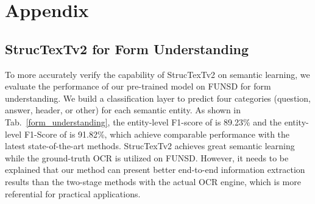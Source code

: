 \documentclass{article} \usepackage{iclr2023_conference,times}
\begin{document}





\appendix
\clearpage
\section{Appendix}
\subsection{StrucTexTv2 for Form Understanding}
To more accurately verify the capability of StrucTexTv2 on semantic learning, we evaluate the performance of our pre-trained model on FUNSD for form understanding. We build a classification layer to predict four categories (question, answer, header, or other) for each semantic entity. As shown in Tab.~\ref{form_understanding}, the entity-level F1-score of  is 89.23\% and the entity-level F1-Score of  is 91.82\%, which achieve comparable performance with the latest state-of-the-art methods. StrucTexTv2 achieves great semantic learning while the ground-truth OCR is utilized on FUNSD. However, it needs to be explained that our method can present better end-to-end information extraction results than the two-stage methods with the actual OCR engine, which is more referential for practical applications.

\begin{table}[ht]
\caption{Experimental results and performance comparison of the form understanding task on FUNSD. The entity-level F1-Score is used to measure model accuracy.}
\label{form_understanding}
\vspace{-0.5em}
\begin{center}
\end{center}
\vspace{-0.5em}
\end{table}
\end{document}
